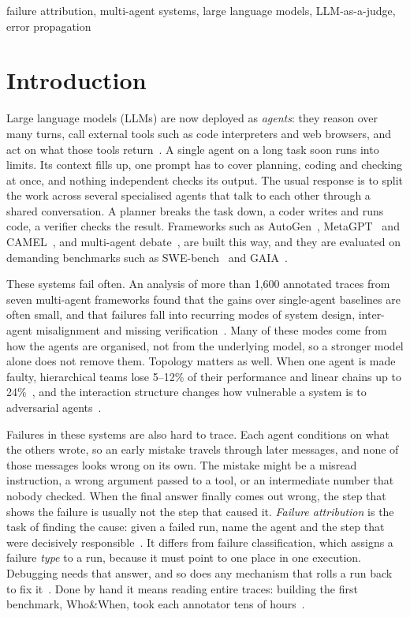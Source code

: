 \documentclass[conference]{IEEEtran}
\begin{document}
\begin{IEEEkeywords}
failure attribution, multi-agent systems, large language models, LLM-as-a-judge, error propagation
\end{IEEEkeywords}

\section{Introduction}
Large language models (LLMs) are now deployed as \emph{agents}: they reason over many turns, call external tools such as code interpreters and web browsers, and act on what those tools return~\cite{yao2023react,shinn2023reflexion}. A single agent on a long task soon runs into limits. Its context fills up, one prompt has to cover planning, coding and checking at once, and nothing independent checks its output. The usual response is to split the work across several specialised agents that talk to each other through a shared conversation. A planner breaks the task down, a coder writes and runs code, a verifier checks the result. Frameworks such as AutoGen~\cite{wu2024autogen}, MetaGPT~\cite{hong2024metagpt} and CAMEL~\cite{li2023camel}, and multi-agent debate~\cite{du2024debate}, are built this way, and they are evaluated on demanding benchmarks such as SWE-bench~\cite{jimenez2024swebench} and GAIA~\cite{mialon2024gaia}.

These systems fail often. An analysis of more than 1,600 annotated traces from seven multi-agent frameworks found that the gains over single-agent baselines are often small, and that failures fall into recurring modes of system design, inter-agent misalignment and missing verification~\cite{cemri2025why}. Many of these modes come from how the agents are organised, not from the underlying model, so a stronger model alone does not remove them. Topology matters as well. When one agent is made faulty, hierarchical teams lose 5--12\% of their performance and linear chains up to 24\%~\cite{huang2025resilience}, and the interaction structure changes how vulnerable a system is to adversarial agents~\cite{kavathekar2026tamas}.

Failures in these systems are also hard to trace. Each agent conditions on what the others wrote, so an early mistake travels through later messages, and none of those messages looks wrong on its own. The mistake might be a misread instruction, a wrong argument passed to a tool, or an intermediate number that nobody checked. When the final answer finally comes out wrong, the step that shows the failure is usually not the step that caused it. \emph{Failure attribution} is the task of finding the cause: given a failed run, name the agent and the step that were decisively responsible~\cite{zhang2025whowhen}. It differs from failure classification, which assigns a failure \emph{type} to a run, because it must point to one place in one execution. Debugging needs that answer, and so does any mechanism that rolls a run back to fix it~\cite{ma2025dover,feng2026conformal}. Done by hand it means reading entire traces: building the first benchmark, Who\&When, took each annotator tens of hours~\cite{zhang2025whowhen}.
\end{document}
